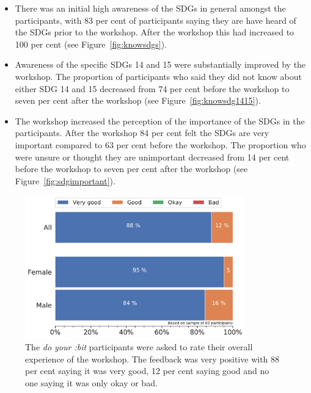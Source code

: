\documentclass[12pt]{report} %
\newcommand{\DYB}{\textit{do your :bit }}
\begin{document}
\begin{itemize}
\item There was an initial high awareness of the SDGs in general amongst the participants, with 83 per cent of participants saying they are have heard of the SDGs prior to the workshop. After the workshop this had increased to 100 per cent (see Figure~\ref{fig:knowsdgs}). 

\item Awareness of the specific SDGs 14 and 15 were substantially improved by the workshop. The proportion of participants who said they did not know about either SDG 14 and 15 decreased from 74 per cent before the workshop to seven per cent after the workshop (see Figure~\ref{fig:knowsdg1415}).

\item The workshop increased the perception of the importance of the SDGs in the participants. After the workshop 84 per cent felt the SDGs are very important compared to 63 per cent before the workshop. The proportion who were unsure or thought they are unimportant decreased from 14 per cent before the workshop to seven per cent after the workshop (see Figure~\ref{fig:sdgimportant}).
  \end{itemize}




\begin{figure}[t!]
    \centering
        \includegraphics[width=0.85\textwidth]{bar_workshopexp}
    \caption{The \DYB participants were asked to rate their overall experience of the workshop. The feedback was very positive with 88 per cent saying it was very good, 12 per cent saying good and no one saying it was only okay or bad. }
    \label{fig:DYBworkshopexp}
\end{figure}
\end{document}

